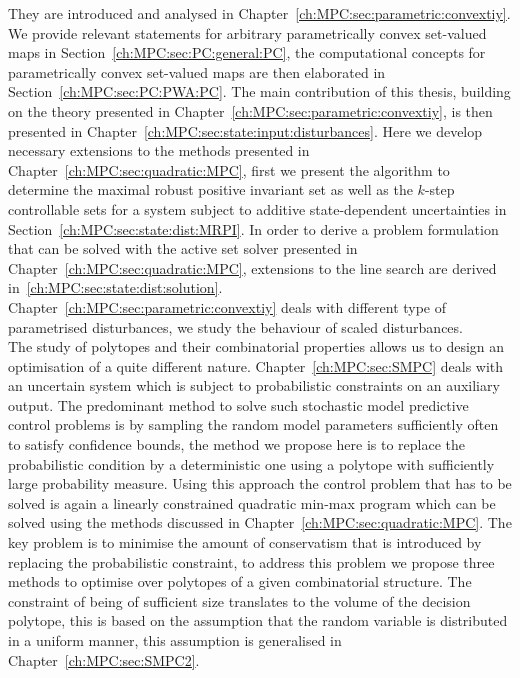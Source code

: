 %
They are introduced and analysed in Chapter~\ref{ch:MPC:sec:parametric:convextiy}.
%
We provide relevant statements for arbitrary parametrically convex set-valued maps in Section~\ref{ch:MPC:sec:PC:general:PC}, the computational concepts for parametrically convex set-valued maps are then elaborated in Section~\ref{ch:MPC:sec:PC:PWA:PC}.
%
The main contribution of this thesis, building on the theory presented in Chapter~\ref{ch:MPC:sec:parametric:convextiy}, is then presented in Chapter~\ref{ch:MPC:sec:state:input:disturbances}.
%
Here we develop necessary extensions to the methods presented in Chapter~\ref{ch:MPC:sec:quadratic:MPC}, first we present the algorithm to determine the maximal robust positive invariant set as well as the $k$-step controllable sets for a system subject to additive state-dependent uncertainties in Section~\ref{ch:MPC:sec:state:dist:MRPI}.
%
In order to derive a problem formulation that can be solved with the active set solver presented in Chapter~\ref{ch:MPC:sec:quadratic:MPC}, extensions to the line search are derived in~\ref{ch:MPC:sec:state:dist:solution}.
%
\\[1em]
%
Chapter~\ref{ch:MPC:sec:parametric:convextiy} deals with different type of parametrised disturbances, we study the behaviour of scaled disturbances.
%
\\[1em]
%
The study of polytopes and their combinatorial properties allows us to design an optimisation of a quite different nature. 
%
Chapter~\ref{ch:MPC:sec:SMPC} deals with an uncertain system which is subject to probabilistic constraints on an auxiliary output.
%
The predominant method to solve such stochastic model predictive control problems is by sampling the random model parameters sufficiently often to satisfy confidence bounds, the method we propose here is to replace the probabilistic condition by a deterministic one using a polytope with sufficiently large probability measure.
%
Using this approach the control problem that has to be solved is again a linearly constrained quadratic min-max program which can be solved using the methods discussed in Chapter~\ref{ch:MPC:sec:quadratic:MPC}.
%
The key problem is to minimise the amount of conservatism that is introduced by replacing the probabilistic constraint, to address this problem we propose three methods to optimise over polytopes of a given combinatorial structure.
%
The constraint of being of sufficient size translates to the volume of the decision polytope, this is based on the assumption that the random variable is distributed in a uniform manner, this assumption is generalised in Chapter~\ref{ch:MPC:sec:SMPC2}.
